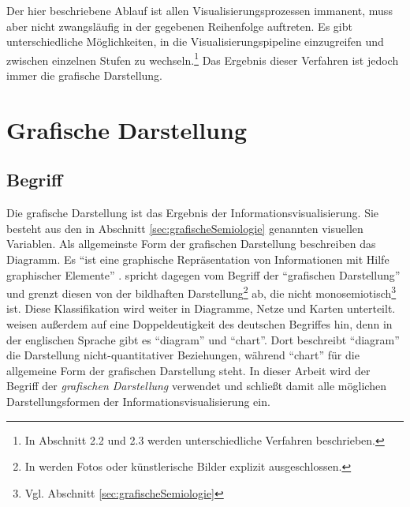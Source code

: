 \documentclass[a4paper, 
               12pt,
               DIV=calc,
               version=first,
               pdftex,
               headsepline,
               footsepline,
               bibtotocnumbered,
               liststotocnumbered]{scrreprt}
\begin{document}
Der hier beschriebene Ablauf ist allen Visualisierungsprozessen immanent, muss aber nicht zwangsläufig
in der gegebenen Reihenfolge auftreten. Es gibt unterschiedliche Möglichkeiten, in die
Visualisierungspipeline einzugreifen und zwischen einzelnen Stufen zu wechseln.\footnote{In
\citep{Schumann} Abschnitt 2.2 und 2.3 werden unterschiedliche Verfahren beschrieben.}
Das Ergebnis dieser Verfahren ist jedoch immer die grafische Darstellung.

\section{Grafische Darstellung}
\label{sec:Darstellungen}
\subsection{Begriff}
Die grafische Darstellung ist das Ergebnis der Informationsvisualisierung. Sie besteht
aus den in Abschnitt \ref{sec:grafischeSemiologie} genannten
visuellen Variablen.
Als allgemeinste Form der grafischen Darstellung beschreiben \citep{Schumann} das
Diagramm. Es "`ist eine graphische Repräsentation von Informationen mit Hilfe
graphischer Elemente"' \citep[S.\,126]{Schumann}. \citep{Bertin} spricht dagegen
vom Begriff der "`grafischen Darstellung"' und grenzt diesen von
der bildhaften Darstellung\footnote{In \citep{Bertin} werden Fotos oder künstlerische Bilder explizit ausgeschlossen.}
ab, die nicht monosemiotisch\footnote{Vgl. Abschnitt \ref{sec:grafischeSemiologie}} ist.
Diese Klassifikation wird weiter in Diagramme, Netze
und Karten unterteilt. \citep[S.\,126]{Schumann} weisen außerdem auf eine Doppeldeutigkeit
des deutschen Begriffes hin, denn in der englischen Sprache gibt es "`diagram"' und "`chart"'.
Dort beschreibt "`diagram"' die Darstellung nicht-quantitativer Beziehungen, während "`chart"' für die
allgemeine Form der grafischen Darstellung steht.
In dieser Arbeit wird der Begriff der \textit{grafischen Darstellung} verwendet und schließt
damit alle möglichen Darstellungsformen der Informationsvisualisierung ein.
\end{document}
